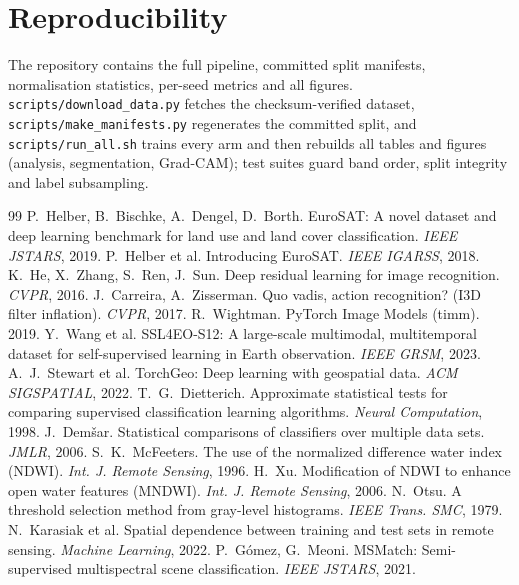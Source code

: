 \documentclass[11pt,a4paper]{article}
\begin{document}
\section{Reproducibility}
The repository contains the full pipeline, committed split manifests,
normalisation statistics, per-seed metrics and all figures.
\texttt{scripts/download\_data.py} fetches the checksum-verified dataset,
\texttt{scripts/make\_manifests.py} regenerates the committed split, and
\texttt{scripts/run\_all.sh} trains every arm and then rebuilds all tables and
figures (analysis, segmentation, Grad-CAM); test suites guard band order, split
integrity and label subsampling.

\FloatBarrier
\begin{thebibliography}{99}\small
{} P.~Helber, B.~Bischke, A.~Dengel, D.~Borth. EuroSAT: A
novel dataset and deep learning benchmark for land use and land cover
classification. \emph{IEEE JSTARS}, 2019.
 P.~Helber et al. Introducing EuroSAT. \emph{IEEE IGARSS},
2018.
 K.~He, X.~Zhang, S.~Ren, J.~Sun. Deep residual learning for
image recognition. \emph{CVPR}, 2016.
 J.~Carreira, A.~Zisserman. Quo vadis, action
recognition? (I3D filter inflation). \emph{CVPR}, 2017.
 R.~Wightman. PyTorch Image Models (timm). 2019.
 Y.~Wang et al. SSL4EO-S12: A large-scale multimodal,
multitemporal dataset for self-supervised learning in Earth observation.
\emph{IEEE GRSM}, 2023.
 A.~J.~Stewart et al. TorchGeo: Deep learning with
geospatial data. \emph{ACM SIGSPATIAL}, 2022.
 T.~G.~Dietterich. Approximate statistical tests for
comparing supervised classification learning algorithms. \emph{Neural
Computation}, 1998.
 J.~Dem\v{s}ar. Statistical comparisons of classifiers over
multiple data sets. \emph{JMLR}, 2006.
 S.~K.~McFeeters. The use of the normalized difference
water index (NDWI). \emph{Int. J. Remote Sensing}, 1996.
 H.~Xu. Modification of NDWI to enhance open water features
(MNDWI). \emph{Int. J. Remote Sensing}, 2006.
 N.~Otsu. A threshold selection method from gray-level
histograms. \emph{IEEE Trans. SMC}, 1979.
 N.~Karasiak et al. Spatial dependence between training
and test sets in remote sensing. \emph{Machine Learning}, 2022.
 P.~G\'omez, G.~Meoni. MSMatch: Semi-supervised
multispectral scene classification. \emph{IEEE JSTARS}, 2021.
\end{thebibliography}
\end{document}
